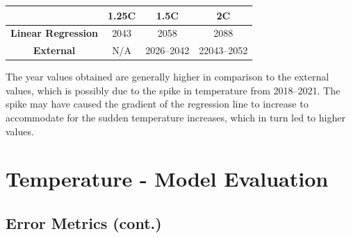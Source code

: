 \documentclass[12pt]{mcmthesis}
\begin{document}
    \begin{center}
        \begin{tabular}{ |c|c|c|c|}
            \hline
            & \textbf{1.25C} & \textbf{1.5C} & \textbf{2C}         \\
            \hline
            \textbf{Linear Regression} & 2043           & 2058          & 2088                \\
            \hline
            \textbf{External}          & N/A            & 2026--2042    & 22043--2052 \\ \hline
        \end{tabular}
    \end{center}

    The year values obtained are generally higher in comparison to the external values, which is possibly due to the spike in temperature from 2018--2021. The spike may have caused the gradient of the regression line to increase to accommodate for the sudden temperature increases, which in turn led to higher values.



    \section{Temperature - Model Evaluation}

    \subsection{Error Metrics (cont.)}
\end{document}
